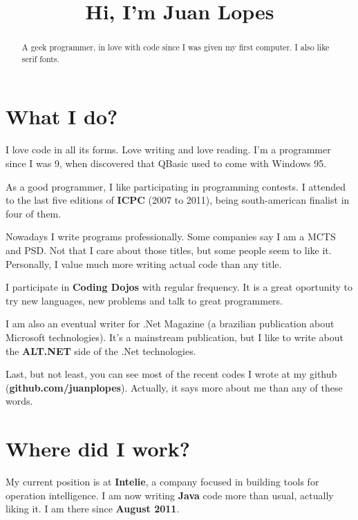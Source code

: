 \documentclass[a4paper,12pt,notitlepage]{article}
\begin{document}
\title{Hi, I'm Juan Lopes}
\renewcommand{\abstractname}{}

\maketitle

\begin{abstract}
\begin{center}
A geek programmer, in love with code since I was given my first computer.
I also like serif fonts.
\end{center}
\end{abstract}


\section{What I do?}

	I love code in all its forms. Love writing and love reading. I'm a programmer since I was 9, when discovered that QBasic used to come with Windows 95. 
	
	As a good programmer, I like participating in programming contests. I attended to the last five editions of \textbf{ICPC} (2007 to 2011), being south-american finalist in four of them.
	
	Nowadays I write programs professionally. Some companies say I am a MCTS and PSD. Not that I care about those titles, but some people seem to like it. Personally, I value much more writing actual code than any title.
	
	I participate in \textbf{Coding Dojos} with regular frequency. It is a great oportunity to try new languages, new problems and talk to great programmers.
	
	I am also an eventual writer for .Net Magazine (a brazilian publication about Microsoft technologies). It's a mainstream publication, but I like to write about the \textbf{ALT.NET} side of the .Net technologies.
	
	Last, but not least, you can see most of the recent codes I wrote at my github (\textbf{github.com/juanplopes}). Actually, it says more about me than any of these words.
	
\section{Where did I work?}

	My current position is at \textbf{Intelie}, a company focused in building tools for operation intelligence. I am now writing \textbf{Java} code more than usual, actually liking it. I am there since \textbf{August 2011}.
	
\end{document}
